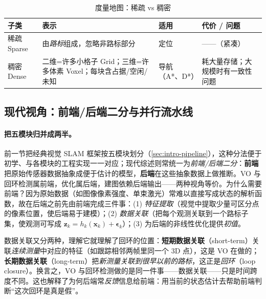 \begin{table}[H]\centering\small
\caption{度量地图：稀疏 vs 稠密}
\label{tab:intro-maps}
\begin{tabular}{p{} p{} p{} p{}}
\toprule
子类 & 表示 & 适用 & 代价 / 问题 \\
\midrule
稀疏 Sparse & 由\emph{路标}组成，忽略非路标部分 & 定位 & ——（紧凑） \\
稠密 Dense & 二维=许多小格子 Grid；三维=许多体素 Voxel；每块含占据/空闲/未知 & 导航（A*、D*） & 耗大量存储；大规模时有一致性问题 \\
\bottomrule
\end{tabular}
\end{table}

\subsection{现代视角：前端/后端二分与并行流水线}
\label{sec:intro-frontback}
\paragraph{把五模块归并成两半。}
前一节把经典视觉 SLAM 框架按五模块划分（\cref{sec:intro-pipeline}），这种分法便于初学、与各模块的工程实现一一对应\cite{gaoxiang2019slam14}；现代综述则常统一为\emph{前端/后端二分}\cite{cadena2016past}：\textbf{前端}把原始传感器数据抽象成便于估计的模型，\textbf{后端}在这些抽象数据上做推断。VO 与回环检测属前端，优化属后端，建图依赖后端输出——两种视角等价。为什么需要前端？因为原始数据（如图像像素强度、单束激光）常难以直接写成状态的解析函数，故在后端之前先由前端完成三件事\cite{cadena2016past}：(1) \emph{特征提取}（视觉中提取少量可区分点的像素位置，使后端易于建模）；(2) \emph{数据关联}（把每个观测关联到一个路标子集，使观测可写成 $\mathbf{z}_k=h_k(\mathbf{x}_k)+\boldsymbol{\epsilon}_k$）；(3) 为后端的非线性优化提供\emph{初值}。

\begin{insight}
数据关联又分两种，理解它就理解了回环的位置\cite{cadena2016past}：\textbf{短期数据关联}（short-term）关联\emph{连续测量}中对应的特征（如跟踪相邻两帧里同一个 3D 点），这是 VO 在做的；\textbf{长期数据关联}（long-term）把\emph{新测量关联到很早以前的路标}，这正是\emph{回环}（loop closure）。换言之，VO 与回环检测做的是同一件事——数据关联——只是时间跨度不同。这也解释了为何后端常\emph{反馈}信息给前端：用当前的状态估计去帮助前端判断“这次回环是真是假”。
\end{insight}

